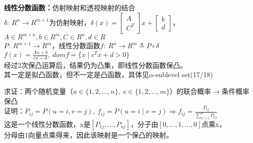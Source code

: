 \documentclass[11pt]{ctexart}         %
\begin{document}
\textbf{线性分数函数：}仿射映射和透视映射的结合\\ [6pt]
$\delta:\ R^n\to R^{m+1}$为仿射映射，$\delta(x)=\left[\begin{array}{c}
	A \\
	C^T
\end{array}
\right]x+\left[\begin{array}{c}
	b \\
	d
\end{array}
\right]$，$A\in R^{m\times n},b\in R^m,C\in R^n,d\in R$\\ [6pt]
$P:\ R^{m+1}\to R^m$，线性分数函数$f:\ R^n\rightarrow R^m\triangleq P\circ \delta$\\ [6pt]
$f(x)=\displaystyle\frac{Ax+b}{cx+d},\ dom f=\{x\mid c^Tx+d>0\}$\\ [6pt]
经过2次保凸运算后，结果仍为凸集，即线性分数函数保凸。\\
其一定是拟凸函数，但不一定是凸函数，具体见$\alpha$-sublevel set(17/18)

求证：两个随机变量（$u\in \{1,2,\dots,n\},\ v\in\{1,2,\dots,m\}$）的联合概率$\to$条件概率保凸\\
证明：$P_{ij}=P(u=i,v=j),\ f_{ij}=P(u=i\mid v=j)\Rightarrow f_{ij}=\displaystyle\frac{P_{ij}}{\sum_{k=1}^nP_{kj}}$\\
\phantom{证明：}这是一个线性分数函数，x是$[P_{1j},\dots,P_{nj}]$，分子由$[0,\dots,1,\dots,0]$点乘x，\\
\phantom{证明：}分母由1向量点乘得来，因此该映射是一个保凸的映射。
\end{document}
